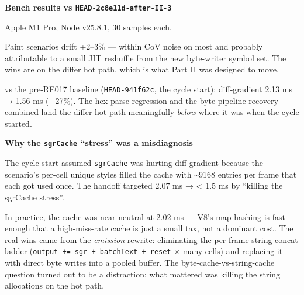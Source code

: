 \textbf{Bench results vs \texttt{H\allowbreak{}E\allowbreak{}A\allowbreak{}D\allowbreak{}-\allowbreak{}2\allowbreak{}c\allowbreak{}8\allowbreak{}e\allowbreak{}1\allowbreak{}1\allowbreak{}d\allowbreak{}-\allowbreak{}a\allowbreak{}f\allowbreak{}t\allowbreak{}e\allowbreak{}r\allowbreak{}-\allowbreak{}I\allowbreak{}I\allowbreak{}-\allowbreak{}3}}

Apple M1 Pro, Node v25.8.1, 30 samples each.



Paint scenarios drift +2--3\% --- within CoV noise on most and probably attributable to a small JIT reshuffle from the new byte-writer symbol set. The wins are on the differ hot path, which is what Part II was designed to move.

vs the pre-RE017 baseline (\texttt{H\allowbreak{}E\allowbreak{}A\allowbreak{}D\allowbreak{}-\allowbreak{}9\allowbreak{}4\allowbreak{}1\allowbreak{}f\allowbreak{}6\allowbreak{}2\allowbreak{}c}, the cycle start): diff-gradient 2.13 ms → 1.56 ms (−27\%). The hex-parse regression and the byte-pipeline recovery combined land the differ hot path meaningfully \emph{below} where it was when the cycle started.

\textbf{Why the \texttt{s\allowbreak{}g\allowbreak{}r\allowbreak{}C\allowbreak{}a\allowbreak{}c\allowbreak{}h\allowbreak{}e} ``stress'' was a misdiagnosis}

The cycle start assumed \texttt{s\allowbreak{}g\allowbreak{}r\allowbreak{}C\allowbreak{}a\allowbreak{}c\allowbreak{}h\allowbreak{}e} was hurting diff-gradient because the scenario's per-cell unique styles filled the cache with \textasciitilde9168 entries per frame that each got used once. The handoff targeted 2.07 ms → \textless{} 1.5 ms by ``killing the sgrCache stress''.

In practice, the cache was near-neutral at 2.02 ms --- V8's map hashing is fast enough that a high-miss-rate cache is just a small tax, not a dominant cost. The real wins came from the \emph{emission} rewrite: eliminating the per-frame string concat ladder (\texttt{o\allowbreak{}u\allowbreak{}t\allowbreak{}p\allowbreak{}u\allowbreak{}t\allowbreak{} \allowbreak{}+\allowbreak{}=\allowbreak{} \allowbreak{}s\allowbreak{}g\allowbreak{}r\allowbreak{} \allowbreak{}+\allowbreak{} \allowbreak{}b\allowbreak{}a\allowbreak{}t\allowbreak{}c\allowbreak{}h\allowbreak{}T\allowbreak{}e\allowbreak{}x\allowbreak{}t\allowbreak{} \allowbreak{}+\allowbreak{} \allowbreak{}r\allowbreak{}e\allowbreak{}s\allowbreak{}e\allowbreak{}t} × many cells) and replacing it with direct byte writes into a pooled buffer. The byte-cache-vs-string-cache question turned out to be a distraction; what mattered was killing the string allocations on the hot path.

